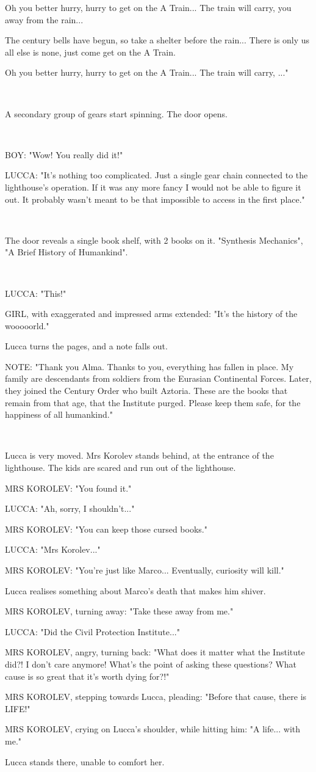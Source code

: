 \documentclass[11pt]{article}
\begin{document}
Oh you better hurry, hurry to get on the A Train...
The train will carry, you away from the rain...

The century bells have begun, so take a shelter before the rain...
There is only us all else is none, just come get on the A Train.

Oh you better hurry, hurry to get on the A Train...
The train will carry, ..."

\ 

A secondary group of gears start spinning.
The door opens.

\ 

BOY: "Wow! You really did it!"

LUCCA: "It's nothing too complicated. Just a single gear chain connected to the lighthouse's operation. 
If it was any more fancy I would not be able to figure it out.
It probably wasn't meant to be that impossible to access in the first place."

\ 

The door reveals a single book shelf, with 2 books on it. 
"Synthesis Mechanics", "A Brief History of Humankind".

\ 

LUCCA: "This!"

GIRL, with exaggerated and impressed arms extended: "It's the history of the wooooorld."

Lucca turns the pages, and a note falls out.

NOTE: "Thank you Alma. Thanks to you, everything has fallen in place.
My family are descendants from soldiers from the Eurasian Continental Forces. 
Later, they joined the Century Order who built Aztoria.
These are the books that remain from that age, that the Institute purged.
Please keep them safe, for the happiness of all humankind."

\ 

Lucca is very moved.
Mrs Korolev stands behind, at the entrance of the lighthouse.
The kids are scared and run out of the lighthouse.

MRS KOROLEV: "You found it."

LUCCA: "Ah, sorry, I shouldn't..."

MRS KOROLEV: "You can keep those cursed books."

LUCCA: "Mrs Korolev..."

MRS KOROLEV: "You're just like Marco...
Eventually, curiosity will kill."

Lucca realises something about Marco's death that makes him shiver.

MRS KOROLEV, turning away: "Take these away from me."

LUCCA: "Did the Civil Protection Institute..."

MRS KOROLEV, angry, turning back: "What does it matter what the Institute did?!
I don't care anymore!
What's the point of asking these questions?
What cause is so great that it's worth dying for?!"

MRS KOROLEV, stepping towards Lucca, pleading: "Before that cause, there is LIFE!"

MRS KOROLEV, crying on Lucca's shoulder, while hitting him: "A life... with me."

Lucca stands there, unable to comfort her.
\end{document}
